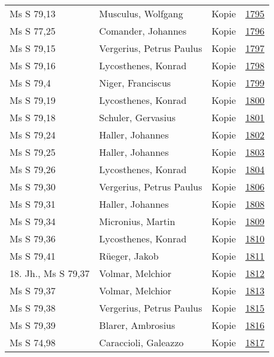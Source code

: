\documentclass[10pt,a4paper,landscape]{report}
\begin{document}
\begin{longtable}{p{16cm}p{4cm}lr}
Ms S 79,13	&	Musculus, Wolfgang	&	Kopie	&	\href{http://130.60.24.72/assignment/1795}{1795}\\
Ms S 77,25	&	Comander, Johannes	&	Kopie	&	\href{http://130.60.24.72/assignment/1796}{1796}\\
Ms S 79,15	&	Vergerius, Petrus Paulus	&	Kopie	&	\href{http://130.60.24.72/assignment/1797}{1797}\\
Ms S 79,16	&	Lycosthenes, Konrad	&	Kopie	&	\href{http://130.60.24.72/assignment/1798}{1798}\\
Ms S 79,4	&	Niger, Franciscus	&	Kopie	&	\href{http://130.60.24.72/assignment/1799}{1799}\\
Ms S 79,19	&	Lycosthenes, Konrad	&	Kopie	&	\href{http://130.60.24.72/assignment/1800}{1800}\\
Ms S 79,18	&	Schuler, Gervasius	&	Kopie	&	\href{http://130.60.24.72/assignment/1801}{1801}\\
Ms S 79,24	&	Haller, Johannes	&	Kopie	&	\href{http://130.60.24.72/assignment/1802}{1802}\\
Ms S 79,25	&	Haller, Johannes	&	Kopie	&	\href{http://130.60.24.72/assignment/1803}{1803}\\
Ms S 79,26	&	Lycosthenes, Konrad	&	Kopie	&	\href{http://130.60.24.72/assignment/1804}{1804}\\
Ms S 79,30	&	Vergerius, Petrus Paulus	&	Kopie	&	\href{http://130.60.24.72/assignment/1806}{1806}\\
Ms S 79,31	&	Haller, Johannes	&	Kopie	&	\href{http://130.60.24.72/assignment/1808}{1808}\\
Ms S 79,34	&	Micronius, Martin	&	Kopie	&	\href{http://130.60.24.72/assignment/1809}{1809}\\
Ms S 79,36	&	Lycosthenes, Konrad	&	Kopie	&	\href{http://130.60.24.72/assignment/1810}{1810}\\
Ms S 79,41	&	Rüeger, Jakob	&	Kopie	&	\href{http://130.60.24.72/assignment/1811}{1811}\\
18. Jh., Ms S 79,37	&	Volmar, Melchior	&	Kopie	&	\href{http://130.60.24.72/assignment/1812}{1812}\\
Ms S 79,37	&	Volmar, Melchior	&	Kopie	&	\href{http://130.60.24.72/assignment/1813}{1813}\\
Ms S 79,38	&	Vergerius, Petrus Paulus	&	Kopie	&	\href{http://130.60.24.72/assignment/1815}{1815}\\
Ms S 79,39	&	Blarer, Ambrosius	&	Kopie	&	\href{http://130.60.24.72/assignment/1816}{1816}\\
Ms S 74,98	&	Caraccioli, Galeazzo	&	Kopie	&	\href{http://130.60.24.72/assignment/1817}{1817}\\

\end{longtable}
\end{document}
